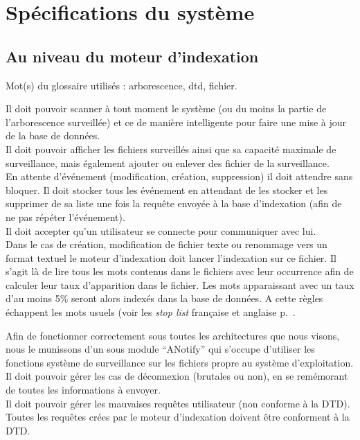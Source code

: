 \chapter{Spécifications du système}

\section{Au niveau du moteur d'indexation}
Mot(s) du glossaire utilisés : \gls{arborescence}, \gls{dtd}, \gls{fichier}.

Il doit pouvoir scanner à tout moment le système (ou du moins la partie de l'arborescence surveillée) et ce de manière intelligente pour faire une mise à jour de la base de données.\\
Il doit pouvoir afficher les fichiers surveillés ainsi que sa capacité maximale de surveillance, mais également ajouter ou enlever des fichier de la surveillance.\\
En attente d'événement (modification, création, suppression) il doit attendre sans bloquer. Il doit stocker tous les événement en attendant de les stocker et les supprimer de sa liste une fois la requête envoyée à la base d'indexation (afin de ne pas répéter l'événement).\\
Il doit accepter qu'un utilisateur se connecte pour communiquer avec lui.\\
Dans le cas de création, modification de fichier texte ou renommage vers un format textuel le moteur d'indexation doit lancer l'indexation sur ce fichier. Il s'agit là de lire tous les mots contenus dans le fichiers avec leur occurrence afin de calculer leur taux d'apparition dans le fichier. Les mots apparaissant avec un taux d'au moins 5\% seront alors indexés dans la base de données. A cette règles échappent les mots usuels (voir les \textit{stop list} française et anglaise p.~\pageref{stop_list}.

Afin de fonctionner correctement sous toutes les architectures que nous visons, nous le munissons d'un sous module \enquote{ANotify} qui s'occupe d'utiliser les fonctions système de surveillance sur les fichiers propre au système d'exploitation.\\
Il doit pouvoir gérer les cas de déconnexion (brutales ou non), en se remémorant de toutes les informations à envoyer.\\
Il doit pouvoir gérer les mauvaises requêtes utilisateur (non conforme à la DTD). Toutes les requêtes crées par le moteur d'indexation doivent être conforment à la DTD.

